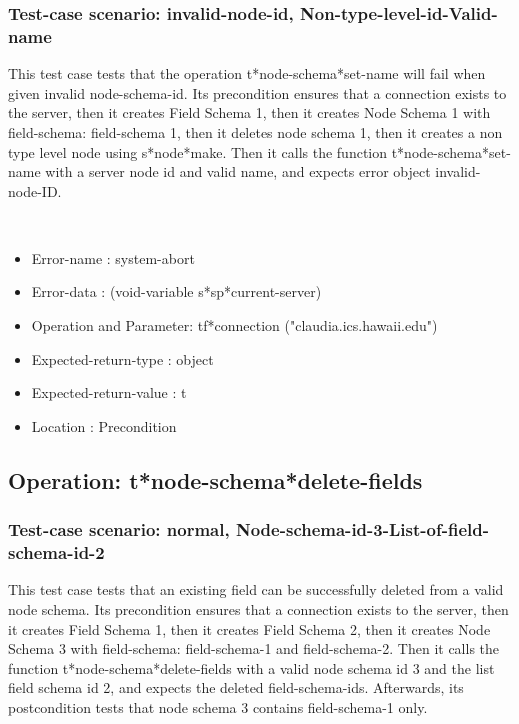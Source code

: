 \subsubsection {Test-case scenario: invalid-node-id, Non-type-level-id-Valid-name}


This test case tests that the operation t*node-schema*set-name will fail when given invalid node-schema-id.
Its precondition ensures that a connection exists to the server, then it creates Field Schema 1, then it creates Node Schema 1 with field-schema: field-schema 1, then it deletes node schema 1, then it creates a non type level node using s*node*make.
Then it calls the function t*node-schema*set-name  with a server node id and valid name, and expects error object invalid-node-ID.



\
\begin {itemize}
\item 	Error-name             : system-abort
\item Error-data             : (void-variable s*sp*current-server)
\item Operation and Parameter: tf*connection ("claudia.ics.hawaii.edu")
\item Expected-return-type   : object
\item Expected-return-value  : t
\item Location               : Precondition



\end {itemize}
\subsection {Operation: t*node-schema*delete-fields}
\subsubsection {Test-case scenario: normal, Node-schema-id-3-List-of-field-schema-id-2}


This test case tests that an existing field can be successfully deleted from a valid node schema.
Its precondition ensures that a connection exists to the server, then it creates Field Schema 1, then it creates Field Schema 2, then it creates Node Schema 3 with field-schema: field-schema-1 and field-schema-2.
Then it calls the function t*node-schema*delete-fields  with a valid node schema id 3 and the list field schema id 2, and expects the deleted field-schema-ids.
Afterwards, its postcondition tests that node schema 3 contains field-schema-1 only.


